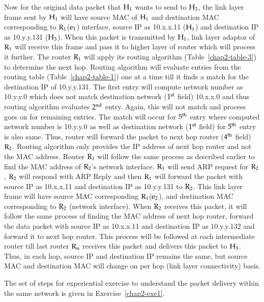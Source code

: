 \begin{multicols}{2}
Now for the original data packet that ${\rm H}_{1}$ wants to send to ${\rm H}_{3}$, the link layer frame sent by ${\rm H}_{1}$ will have source MAC of ${\rm H}_{1}$ and destination MAC corresponding to ${\rm R}_{1}$(${\rm e}_{1}$) interface, source IP as 10.x.x.11 (${\rm H}_{1}$) and destination IP as 10.y.y.131 (${\rm H}_{3}$). When this packet is transmitted by ${\rm H}_{1}$, link layer adaptor of ${\rm R}_{1}$ will receive this frame and pass it to higher layer of router which will process it further. The router ${\rm R}_{1}$ will apply its routing algorithm (Table~\ref{chap2-table-3}) to determine the next hop. Routing algorithm will evaluate entries from the routing table (Table~\ref{chap2-table-1}) one at a time till it finds a match for the destination IP of 10.y.y.131. The first entry will compute network number as   10.y.y.0 which does not match destination network ($1^{\rm st}$ field) 10.x.x.0 and thus routing algorithm evaluates $2^{\rm nd}$ entry. Again, this will not match and process goes on for remaining entries. The match will occur for $5^{\rm th}$ entry where computed network number is 10.y.y.0 as well as destination network ($1^{\rm st}$ field) for $5^{\rm th}$ entry is also same. Thus, router will forward the packet to next hop router ($4^{\rm th}$ field) ${\rm R}_{2}$. Routing algorithm only provides the IP address of next hop router and not the MAC address. Router ${\rm R}_{1}$ will follow the same process as described earlier to find the MAC address of ${\rm R}_{2}$’s network interface. ${\rm R}_{1}$ will send ARP request for ${\rm R}_{2}$, ${\rm R}_{2}$ will respond with ARP Reply and then ${\rm R}_{1}$ will forward the packet with source IP as 10.x.x.11 and destination IP as 10.y.y.131 to ${\rm R}_{2}$. This link layer frame will have source MAC corresponding ${\rm R}_{1}$(${\rm e}_{2}$), and destination MAC corresponding to ${\rm R}_{2}$ (network interface). When ${\rm R}_{2}$ receives this packet, it will follow the same process of finding the MAC address of next hop router, forward the data packet with source IP as 10.x.x.11 and destination IP as 10.y.y.132 and forward it to next hop router. This process will be followed at each intermediate router till last router ${\rm R}_{\rm n}$ receives this packet and delivers this packet to ${\rm H}_{3}$. Thus, in each hop, source IP and destination IP remains the same, but source MAC and destination MAC will change on per hop (link layer connectivity) basis.

The set of steps for experiential exercise to understand the packet delivery within the same network is given in Exercise~\ref{chap2-exe1}.


\end{multicols}
